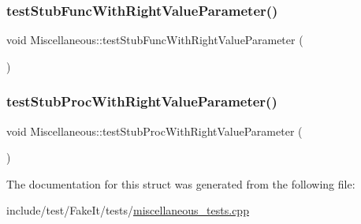 \mbox{\label{structMiscellaneous_a8a33c8b6f5a98c424e0b2b87d8c9d243}} 
\subsubsection{\texorpdfstring{testStubFuncWithRightValueParameter()}{testStubFuncWithRightValueParameter()}}
{\footnotesize\ttfamily void Miscellaneous\+::test\+Stub\+Func\+With\+Right\+Value\+Parameter (\begin{DoxyParamCaption}{ }\end{DoxyParamCaption})\hspace{0.3cm}{\ttfamily [inline]}}

\mbox{\label{structMiscellaneous_aedb44a371ae0b7b08114ad63a3e32929}} 
\subsubsection{\texorpdfstring{testStubProcWithRightValueParameter()}{testStubProcWithRightValueParameter()}}
{\footnotesize\ttfamily void Miscellaneous\+::test\+Stub\+Proc\+With\+Right\+Value\+Parameter (\begin{DoxyParamCaption}{ }\end{DoxyParamCaption})\hspace{0.3cm}{\ttfamily [inline]}}



The documentation for this struct was generated from the following file\+:\begin{DoxyCompactItemize}
\item 
include/test/\+Fake\+It/tests/\mbox{\hyperlink{miscellaneous__tests_8cpp}{miscellaneous\+\_\+tests.\+cpp}}\end{DoxyCompactItemize}
